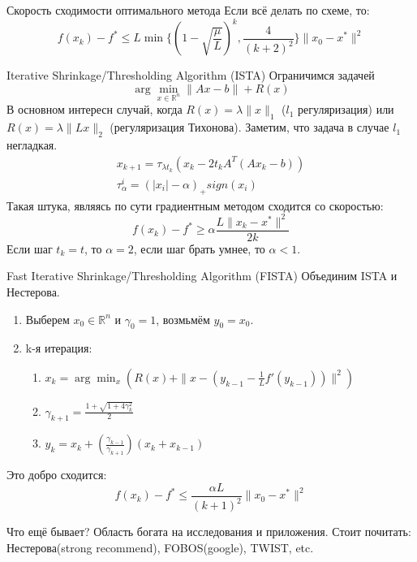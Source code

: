 \documentclass[14pt, fleqn, xcolor={dvipsnames, table}]{beamer}
\begin{document}
\begin{frame}{Скорость сходимости оптимального метода}
Если всё делать по схеме, то:
$$
f(x_k) - f^* \le L\min\{(1-\sqrt{\frac{\mu}{L}})^k, \frac{4}{(k+2)^2}\}\|x_0-x^*\|^2
$$
\end{frame}

\begin{frame}{Iterative Shrinkage/Thresholding Algorithm (ISTA)}
\small
Ограничимся задачей
$$
\arg\min_{x \in \mathbb{R}^n}\|Ax - b\| + R(x)
$$
В основном интересн случай, когда $R(x) = \lambda \|x\|_1$ ($l_1$ регуляризация) или $R(x)=\lambda\|Lx\|_2$ (регуляризация Тихонова).
Заметим, что задача в случае $l_1$ негладкая.
$$\begin{array}{l}
x_{k+1} = \tau_{\lambda t_k}(x_k - 2t_kA^T(Ax_k - b)) \\
\tau_{\alpha}^i = (|x_i| - \alpha)_{+}sign(x_i)
\end{array}$$
Такая штука, являясь по сути градиентным методом сходится со скоростью:
$$
f(x_k) - f^* \ge \alpha \frac{L\|x_k - x^*\|^2}{2k}
$$
Если шаг $t_k = t$, то $\alpha=2$, если шаг брать умнее, то $\alpha<1$.
\end{frame}

\begin{frame}{Fast Iterative Shrinkage/Thresholding Algorithm (FISTA)}
Объединим ISTA и Нестерова.
\begin{enumerate}
  \item Выберем $x_0 \in \mathbb{R}^n$ и $\gamma_0 = 1$, возмьмём $y_0=x_0$.
  \item k-я итерация:
  \begin{enumerate}
    \item $x_k = \arg\min_x(R(x) + \|x - (y_{k-1} - \frac{1}{L}f'(y_{k-1}))\|^2)$
    \item $\gamma_{k+1} = \frac{1 + \sqrt{1+4\gamma_k^2}}{2}$
    \item $y_k = x_k + (\frac{\gamma_{k-1}}{\gamma_{k+1}})(x_k + x_{k-1})$
  \end{enumerate}
\end{enumerate}
Это добро сходится:
$$
f(x_k) - f^* \le \frac{\alpha L}{(k+1)^2}\|x_0 - x^*\|^2
$$
\end{frame}


\begin{frame}{Что ещё бывает?}
Область богата на исследования и приложения. Стоит почитать: Нестерова(strong recommend), FOBOS(google), TWIST, etc.
\end{frame}
\end{document}
